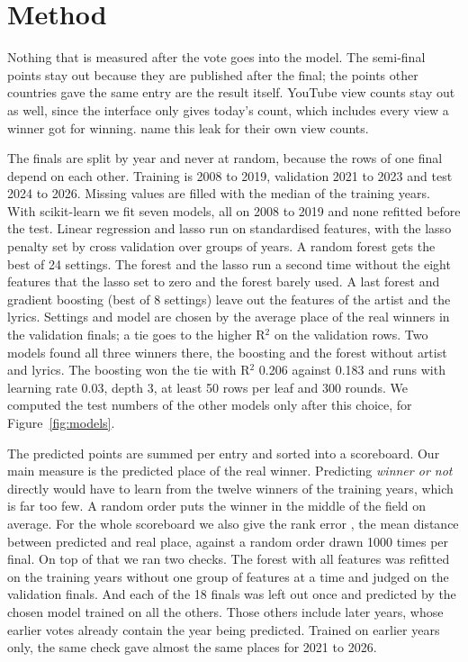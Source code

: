 \section{Method}

Nothing that is measured after the vote goes into the model. The semi-final points stay out because they are published after the final; the points other countries gave the same entry are the result itself. YouTube view counts stay out as well, since the interface only gives today's count, which includes every view a winner got for winning. \citet{adamska2025} name this leak for their own view counts.

The finals are split by year and never at random, because the rows of one final depend on each other. Training is 2008 to 2019, validation 2021 to 2023 and test 2024 to 2026. Missing values are filled with the median of the training years. With scikit-learn \citep{pedregosa2011} we fit seven models, all on 2008 to 2019 and none refitted before the test. Linear regression and lasso run on standardised features, with the lasso penalty set by cross validation over groups of years. A random forest gets the best of 24 settings. The forest and the lasso run a second time without the eight features that the lasso set to zero and the forest barely used. A last forest and gradient boosting (best of 8 settings) leave out the features of the artist and the lyrics. Settings and model are chosen by the average place of the real winners in the validation finals; a tie goes to the higher R$^2$ on the validation rows. Two models found all three winners there, the boosting and the forest without artist and lyrics. The boosting won the tie with R$^2$ 0.206 against 0.183 and runs with learning rate 0.03, depth 3, at least 50 rows per leaf and 300 rounds. We computed the test numbers of the other models only after this choice, for Figure~\ref{fig:models}.

The predicted points are summed per entry and sorted into a scoreboard. Our main measure is the predicted place of the real winner. Predicting \emph{winner or not} directly would have to learn from the twelve winners of the training years, which is far too few. A random order puts the winner in the middle of the field on average. For the whole scoreboard we also give the rank error \citep{adamska2025}, the mean distance between predicted and real place, against a random order drawn 1000 times per final. On top of that we ran two checks. The forest with all features was refitted on the training years without one group of features at a time and judged on the validation finals. And each of the 18 finals was left out once and predicted by the chosen model trained on all the others. Those others include later years, whose earlier votes already contain the year being predicted. Trained on earlier years only, the same check gave almost the same places for 2021 to 2026.

